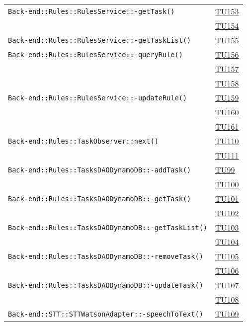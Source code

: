 \begin{longtable}{|>{\centering}m{12cm}|m{1cm}<{\centering}|}
\texttt{Back-end::Rules::RulesService::-\linebreak getTask()} & \hyperlink{TU153}{TU153}\\ & \hyperlink{TU154}{TU154}\\ \hline
\texttt{Back-end::Rules::RulesService::-\linebreak getTaskList()} & \hyperlink{TU155}{TU155}\\ \hline
\texttt{Back-end::Rules::RulesService::-\linebreak queryRule()} & \hyperlink{TU156}{TU156}\\ & \hyperlink{TU157}{TU157}\\ & \hyperlink{TU158}{TU158}\\ \hline
\texttt{Back-end::Rules::RulesService::-\linebreak updateRule()} & \hyperlink{TU159}{TU159}\\ & \hyperlink{TU160}{TU160}\\ & \hyperlink{TU161}{TU161}\\ \hline
\texttt{Back-end::Rules::TaskObserver::next()} & \hyperlink{TU110}{TU110}\\ & \hyperlink{TU111}{TU111}\\ \hline
\texttt{Back-end::Rules::TasksDAODynamoDB::-\linebreak addTask()} & \hyperlink{TU99}{TU99}\\ & \hyperlink{TU100}{TU100}\\ \hline
\texttt{Back-end::Rules::TasksDAODynamoDB::-\linebreak getTask()} & \hyperlink{TU101}{TU101}\\ & \hyperlink{TU102}{TU102}\\ \hline
\texttt{Back-end::Rules::TasksDAODynamoDB::-\linebreak getTaskList()} & \hyperlink{TU103}{TU103}\\ & \hyperlink{TU104}{TU104}\\ \hline
\texttt{Back-end::Rules::TasksDAODynamoDB::-\linebreak removeTask()} & \hyperlink{TU105}{TU105}\\ & \hyperlink{TU106}{TU106}\\ \hline
\texttt{Back-end::Rules::TasksDAODynamoDB::-\linebreak updateTask()} & \hyperlink{TU107}{TU107}\\ & \hyperlink{TU108}{TU108}\\ \hline
\texttt{Back-end::STT::STTWatsonAdapter::-\linebreak speechToText()} & \hyperlink{TU109}{TU109}\\ \hline

\end{longtable}
